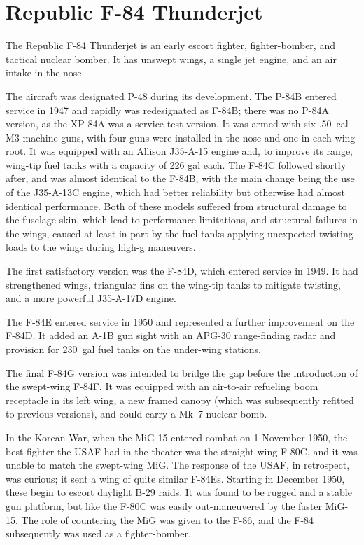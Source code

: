 \section*{Republic F-84 Thunderjet}

The Republic F-84 Thunderjet is an early escort fighter, fighter-bomber, and tactical nuclear bomber. It has unswept wings, a single jet engine, and an air intake in the nose. 

The aircraft was designated P-48 during its development. The P-84B entered service in 1947 and rapidly was redesignated as F-84B; there was no P-84A version, as the XP-84A was a service test version. It was armed with six .50~cal M3 machine guns, with four guns were installed in the nose and one in each wing root. It was equipped with an Allison J35-A-15 engine and, to improve its range, wing-tip fuel tanks with a capacity of 226 gal each. The F-84C followed shortly after, and was almost identical to the F-84B, with the main change being the use of the J35-A-13C engine, which had better reliability but otherwise had almost identical performance. Both of these models suffered from structural damage to the fuselage skin, which lead to performance limitations, and structural failures in the wings, caused at least in part by the fuel tanks applying unexpected twisting loads to the wings during high-g maneuvers.

The first satisfactory version was the F-84D, which entered service in 1949. It had strengthened wings, triangular fins on the wing-tip tanks to mitigate twisting, and a more powerful J35-A-17D engine.

The F-84E entered service in 1950 and represented a further improvement on the F-84D. It added an A-1B gun sight with an APG-30 range-finding radar and provision for 230~gal fuel tanks on the under-wing stations.

The final F-84G version was intended to bridge the gap before the introduction of the swept-wing F-84F. It was equipped with an air-to-air refueling boom receptacle in its left wing, a new framed canopy (which was subsequently refitted to previous versions), and could carry a Mk~7 nuclear bomb.

In the Korean War, when the MiG-15 entered combat on 1 November 1950, the best fighter the USAF had in the theater was the straight-wing F-80C, and it was unable to match the swept-wing MiG. The response of the USAF, in retrospect, was curious; it sent a wing of quite similar F-84Es. Starting in December 1950, these begin to escort daylight B-29 raids. It was found to be rugged and a stable gun platform, but like the F-80C was easily out-maneuvered by the faster MiG-15. The role of countering the MiG was given to the F-86, and the F-84 subsequently was used as a fighter-bomber.

